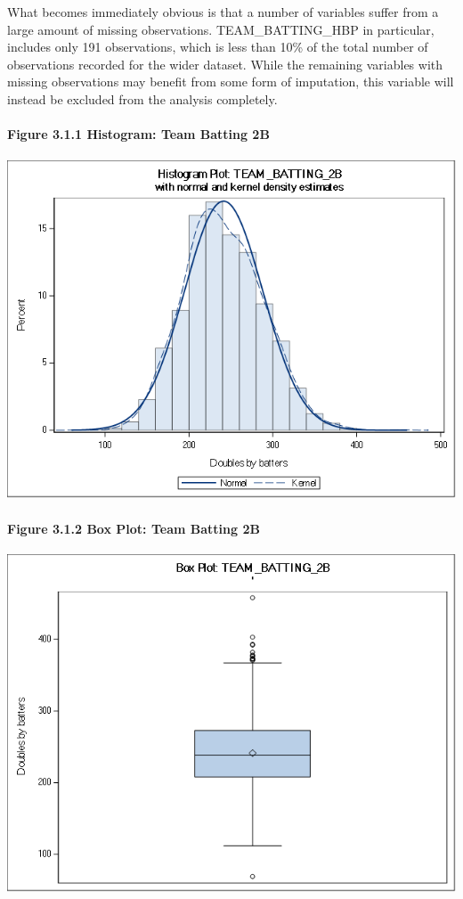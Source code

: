 \documentclass[]{article}
\let\oldparagraph\paragraph
\renewcommand{\paragraph}[1]{\oldparagraph{#1}\mbox{}}
\begin{document}
What becomes immediately obvious is that a number of variables suffer
from a large amount of missing observations. TEAM\_BATTING\_HBP in
particular, includes only 191 observations, which is less than 10\% of
the total number of observations recorded for the wider dataset. While
the remaining variables with missing observations may benefit from some
form of imputation, this variable will instead be excluded from the
analysis completely.

\newpage

\paragraph{Figure 3.1.1 Histogram: Team Batting
2B}\label{figure-3.1.1-histogram-team-batting-2b}

\includegraphics[height=3.95833in]{images/hist_team_batting_2b.png}

\paragraph{Figure 3.1.2 Box Plot: Team Batting
2B}\label{figure-3.1.2-box-plot-team-batting-2b}

\includegraphics[height=3.95833in]{images/box_team_batting_2b.png}
\end{document}
